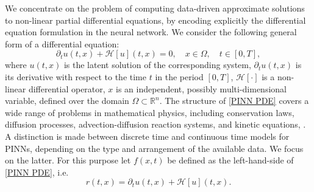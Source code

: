 We concentrate on the problem of computing data-driven approximate solutions to non-linear partial differential equations, by encoding explicitly the differential equation formulation in the neural network. We consider the following general form of a differential equation:
\begin{equation}
    \label{PINN PDE}
    \partial_t u(t,x) + \mathcal{H} \left[ u \right] (t, x) = 0, \quad x \in \Omega, \quad t \in \left[ 0, T \right], 
\end{equation}
where $u(t,x)$ is the latent solution of the corresponding system, $\partial_t u(t,x)$ is its derivative with respect to the time $t$ in the period $\left[ 0, T \right]$, $\mathcal{H} \left[ \cdot \right]$ is a non-linear differential operator, $x$ is an independent, possibly multi-dimensional variable, defined over the domain $\Omega \subset \mathbb{R}^{n}$. The structure of \cref{PINN PDE} covers a wide range of problems in mathematical physics, including conservation laws, diffusion processes, advection-diffusion reaction systems, and kinetic equations, \cite[p.~3]{RaissiPerdikarisKarniadakisPart1:2017}. \\
A distinction is made between discrete time and continuous time models for PINNs, depending on the type and arrangement of the available data. We focus on the latter. For this purpose let $f(x,t)$ be defined as the left-hand-side of \cref{PINN PDE}, i.e.
\begin{equation}
    \label{Residual Network}
    r(t,x) = \partial_t u(t,x) + \mathcal{H} \left[ u \right] (t, x).
\end{equation}
